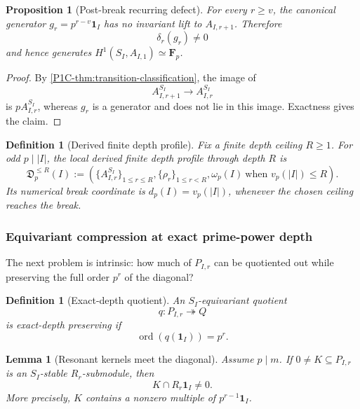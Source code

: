 \documentclass[11pt]{article}
\newtheorem{proposition}[theorem]{Proposition}
\newtheorem{lemma}[theorem]{Lemma}
\newtheorem{definition}[theorem]{Definition}
\theoremstyle{remark}
\newcommand{\F}{\mathbf F}
\providecommand{\Ord}{\operatorname{Ord}}
\renewcommand{\Ord}{\operatorname{ord}}
\begin{document}
\begin{proposition}[Post-break recurring defect]\label{P1C-prop:post-break}
For every \(r\ge v\), the canonical generator \(g_r=p^{r-v}\mathbf1_I\) has no invariant lift to \(A_{I,r+1}\).  Therefore
\[
 \delta_r(g_r)\ne0
\]
and hence generates \(H^1(S_I,A_{I,1})\simeq\F_p\).
\end{proposition}

\begin{proof}
By \cref{P1C-thm:transition-classification}, the image of
\[
 A_{I,r+1}^{S_I}\to A_{I,r}^{S_I}
\]
is \(pA_{I,r}^{S_I}\), whereas \(g_r\) is a generator and does not lie in this image.  Exactness gives the claim.
\end{proof}

\begin{definition}[Derived finite depth profile]
Fix a finite depth ceiling \(R\ge1\).  For odd \(p\mid |I|\), the local derived finite depth profile through depth \(R\) is
\[
 \mathfrak D_p^{\le R}(I)
 :=\left(
 \{A_{I,r}^{S_I}\}_{1\le r\le R},
 \{\rho_r\}_{1\le r<R},
 \omega_p(I)\ \text{when }v_p(|I|)\le R
 \right).
\]
Its numerical break coordinate is \(d_p(I)=v_p(|I|)\), whenever the chosen ceiling reaches the break.
\end{definition}

\subsubsection{Equivariant compression at exact prime-power depth}

The next problem is intrinsic: how much of \(P_{I,r}\) can be quotiented out while preserving the full order \(p^r\) of the diagonal?

\begin{definition}[Exact-depth quotient]
An \(S_I\)-equivariant quotient
\[
 q:P_{I,r}\twoheadrightarrow Q
\]
is \emph{exact-depth preserving} if
\[
 \Ord(q(\mathbf1_I))=p^r.
\]
\end{definition}

\begin{lemma}[Resonant kernels meet the diagonal]\label{P1C-lem:kernel-meets-diagonal}
Assume \(p\mid m\).  If \(0\ne K\subseteq P_{I,r}\) is an \(S_I\)-stable \(R_r\)-submodule, then
\[
 \boxed{K\cap R_r\mathbf1_I\ne0.}
\]
More precisely, \(K\) contains a nonzero multiple of \(p^{r-1}\mathbf1_I\).
\end{lemma}
\end{document}
